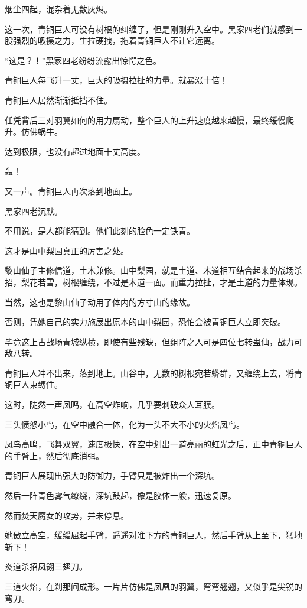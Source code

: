 \begin{this_body}
烟尘四起，混杂着无数灰烬。

这一次，青铜巨人可没有树根的纠缠了，但是刚刚升入空中。黑家四老们就感到一股强烈的吸摄之力，生拉硬拽，拖着青铜巨人不让它远离。

“这是？！”黑家四老纷纷流露出惊愕之色。

青铜巨人每飞升一丈，巨大的吸摄拉扯的力量。就暴涨十倍！

青铜巨人居然渐渐抵挡不住。

任凭背后三对羽翼如何的用力扇动，整个巨人的上升速度越来越慢，最终缓慢爬升。仿佛蜗牛。

达到极限，也没有超过地面十丈高度。

轰！

又一声。青铜巨人再次落到地面上。

黑家四老沉默。

不用说，是人都能猜到。他们此刻的脸色一定铁青。

这才是山中梨园真正的厉害之处。

黎山仙子主修信道，土木兼修。山中梨园，就是土道、木道相互结合起来的战场杀招，梨花若雪，树根缠绕，不过是木道一面。而重力拉扯，才是土道的力量体现。

当然，这也是黎山仙子动用了体内的方寸山的缘故。

否则，凭她自己的实力施展出原本的山中梨园，恐怕会被青铜巨人立即突破。

毕竟这上古战场青城纵横，即使有些残缺，但组阵之人可是四位七转蛊仙，战力可敌八转。

青铜巨人冲不出来，落到地上。山谷中，无数的树根宛若蟒群，又缠绕上去，将青铜巨人束缚住。

这时，陡然一声凤鸣，在高空炸响，几乎要刺破众人耳膜。

三头愤怒小鸟，在空中融合一体，化为一头不大不小的火焰凤鸟。

凤鸟高鸣，飞舞双翼，速度极快，在空中划出一道亮丽的虹光之后，正中青铜巨人的手臂上，然后彻底消弭。

青铜巨人展现出强大的防御力，手臂只是被炸出一个深坑。

然后一阵青色雾气缭绕，深坑鼓起，像是胶体一般，迅速复原。

然而焚天魔女的攻势，并未停息。

她傲立高空，缓缓屈起手臂，遥遥对准下方的青铜巨人，然后手臂从上至下，猛地斩下！

炎道杀招凤翎三翅刀。

三道火焰，在刹那间成形。一片片仿佛是凤凰的羽翼，弯弯翘翘，又似乎是尖锐的弯刀。


\end{this_body}

